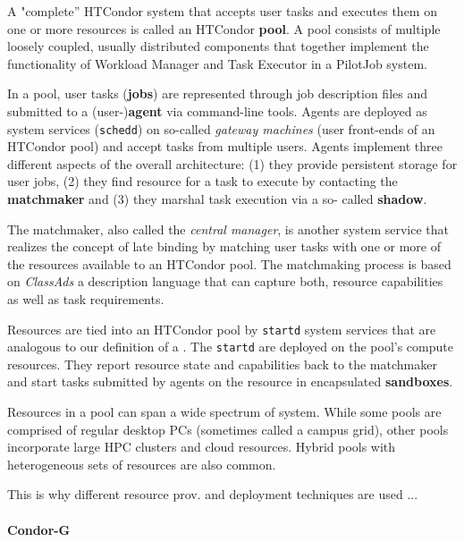 \documentclass{sig-alternate}
\begin{document}

A "complete'' HTCondor system that accepts user tasks and executes them on one
or more resources is called an HTCondor \textbf{pool}. A pool consists of
multiple loosely coupled, usually distributed  components that together
implement the functionality of Workload Manager and Task Executor in a 
PilotJob system.

In a pool, user tasks (\textbf{jobs}) are represented through job description
files and submitted to a (user-)\textbf{agent} via command-line tools. Agents
are deployed as system services (\texttt{schedd}) on so-called \textit{gateway
machines} (user front-ends of an HTCondor pool) and accept tasks from multiple
users. Agents implement three different aspects of the overall architecture: (1)
they provide persistent storage for user jobs, (2) they find resource for a task
to execute by contacting the \textbf{matchmaker} and (3) they marshal task
execution via a so- called \textbf{shadow}.

The matchmaker, also called the \textit{central manager}, is another system 
service that realizes the concept of late binding by matching user tasks 
with one or more of the resources available to an HTCondor pool. The 
matchmaking process is based on \textit{ClassAds} a description language that 
can capture both, resource capabilities as well as task requirements. 

Resources are tied into an HTCondor pool by \texttt{startd} system services that
are analogous to our definition of a \pilot. The \texttt{startd} \pilots are
deployed on the pool's compute resources. They report resource state and 
capabilities back to the matchmaker and start tasks submitted by agents on
the resource in encapsulated \textbf{sandboxes}.

Resources in a pool can span a wide spectrum of system. While some pools
are comprised of regular desktop PCs (sometimes called a campus grid), other
pools incorporate large HPC clusters and cloud resources. Hybrid pools with
heterogeneous sets of resources are also common.

This is why different resource prov. and deployment techniques are used ... 

\paragraph{Condor-G}
\end{document}
